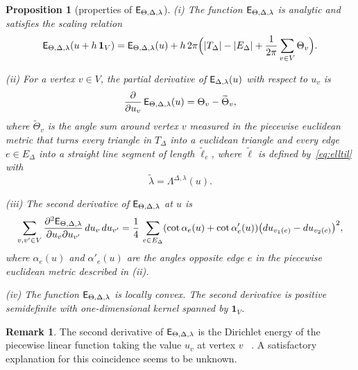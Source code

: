 \documentclass[a4paper, 11pt]{article}
\newcommand{\lamtil}{\tilde{\lambda}}
\newcommand{\elltil}{\tilde{\ell}}
\newcommand{\Esf}{\scalebox{0.94}{$\mathsf{E}$}}
\theoremstyle{plain}
\newtheorem{proposition}[theorem]{Proposition}
\theoremstyle{definition}
\newtheorem{remark}[theorem]{Remark}
\begin{document}
\begin{proposition}[properties of $\Esf_{\Theta,\Delta,\lambda}$]
  \label{prop:Esf}
  (i) The function $\Esf_{\Theta,\Delta,\lambda}$ is analytic and satisfies
  the scaling relation
  \begin{equation}
    \label{Esfscale}
    \begin{aligned}
      \Esf_{\Theta,\Delta,\lambda}(u+h\,\mathbf{1}_{V})
      =\Esf_{\Theta,\Delta,\lambda}(u)
      +h\,2\pi
      \Big(
      |T_{\Delta}|-|E_{\Delta}|+\frac{1}{2\pi}\sum_{v\in V}\Theta_{v}
      \Big).
    \end{aligned}
  \end{equation}
  
  (ii) For a vertex $v\in V$, the partial derivative of
  $\Esf_{\Delta,\lambda}(u)$ with respect to $u_{v}$ is
  \begin{equation}
    \label{eq:Esfpartial}
    \frac{\partial}{\partial u_{v}}\,\Esf_{\Theta,\Delta,\lambda}(u)
    =\Theta_{v}-\widetilde{\Theta}_{v},
  \end{equation}
  where $\widetilde{\Theta}_{v}$ is the angle sum around vertex $v$
  measured in the piecewise euclidean metric that turns every triangle
  in $T_{\Delta}$ into a euclidean triangle and every edge
  $e\in E_{\Delta}$ into a straight line segment of length
  $\elltil_{e}$, where $\elltil$ is defined by~\eqref{eq:elltil} with
  \begin{equation*}
    \lamtil=\Lambda^{\Delta,\lambda}(u).
  \end{equation*}

  (iii) The second derivative of $\Esf_{\Theta,\Delta,\lambda}$ at $u$ is
  \begin{equation}
    \label{eq:d2Esf}
      \sum_{v,v'\in V}
      \frac{\partial^{2}\Esf_{\Theta,\Delta,\lambda}} {\partial
        u_{v}\partial u_{v'}} \,du_{v}\,du_{v'} =
      \frac{1}{4}\,\sum_{e\in E_{\Delta}}
      (\cot\alpha_{e}(u)+\cot\alpha_{e}'(u))
      \big(du_{v_{1}(e)}-du_{v_{2}(e)}\big)^{2},
  \end{equation}
  where $\alpha_{e}(u)$ and $\alpha'_{e}(u)$ are the angles opposite
  edge $e$ in the piecewise euclidean metric described in (ii).

  (iv) The function $\Esf_{\Theta,\Delta,\lambda}$ is locally convex. The
  second derivative is positive semidefinite with one-dimensional
  kernel spanned by $\mathbf{1}_{V}$. 
\end{proposition}

\begin{remark}
  \label{rem:d2Esf}
  The second derivative of $\Esf_{\Theta,\Delta,\lambda}$ is the
  Dirichlet energy of the piecewise linear function taking the value
  $u_{v}$ at vertex $v$~\cite[eq.~(8)]{duffin59} \cite{pinkall93}. A
  satisfactory explanation for this coincidence seems to be unknown.
\end{remark}
\end{document}
